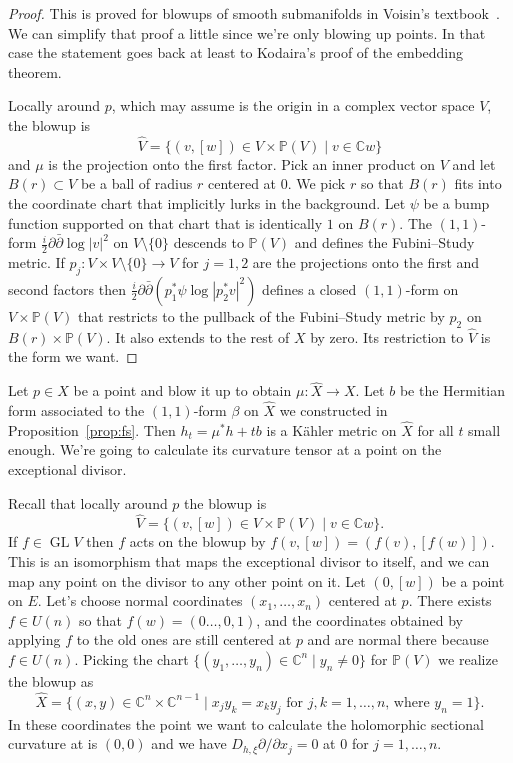 \documentclass[10pt,a4paper]{amsart}
\newcommand{\kk}[1]{\mathbb{#1}}
\DeclareMathOperator{\GL}{GL}
\def\hsc{holomorphic sectional curvature}
\def\bl#1{\widehat{#1}}
\begin{document}
\begin{proof}
This is proved for blowups of smooth submanifolds in
Voisin's textbook~\cite{voisin2002theorie}.
We can simplify that proof a little since we're only blowing up points.
In that case the statement goes back at least to Kodaira's proof of the
embedding theorem.


Locally around $p$, which may assume is the origin in a complex vector space
$V$, the blowup is
$$
\bl V
= \{ (v,[w]) \in V \times \kk P(V) \mid v \in \kk C w \}
$$
and $\mu$ is the projection onto the first factor.
Pick an inner product on $V$ and let $B(r) \subset V$ be a ball of radius $r$
centered at $0$.
We pick $r$ so that $B(r)$ fits into the coordinate chart that implicitly lurks
in the background.
Let $\psi$ be a bump function supported on that chart that is identically $1$
on $B(r)$.
The $(1,1)$-form $\frac i2 \partial\bar\partial \log |v|^2$ on $V \setminus
\{0\}$ descends to $\kk P(V)$ and defines the Fubini--Study metric.
If $p_j : V \times V \setminus \{0\} \to V$ for $j = 1,2$ are the projections
onto the first and second factors then
$\frac i2 \partial \bar\partial (p_1^*\psi \log |p_2^*v|^2)$
defines a closed $(1,1)$-form on $V \times \kk P(V)$ that restricts to the
pullback of the Fubini--Study metric by $p_2$ on $B(r) \times \kk P(V)$.
It also extends to the rest of $X$ by zero.
Its restriction to $\bl V$ is the form we want.
\end{proof}




Let $p \in X$ be a point and blow it up to obtain $\mu : \bl X \to X$.
Let $b$ be the Hermitian form associated to the $(1,1)$-form $\beta$ on $\bl X$
we constructed in Proposition~\ref{prop:fs}.
Then $h_t = \mu^*h + t b$ is a K\"ahler metric on $\bl X$ for all $t$ small
enough.
We're going to calculate its curvature tensor at a point on the exceptional
divisor.

Recall that locally around $p$ the blowup is
$$
\bl V
= \{ (v,[w]) \in V \times \kk P(V) \mid v \in \kk C w \}.
$$
If $f \in \GL V$ then $f$ acts on the blowup by $f(v, [w]) = (f(v), [f(w)])$.
This is an isomorphism that maps the exceptional divisor to itself, and we can
map any point on the divisor to any other point on it.
Let $(0, [w])$ be a point on $E$.
Let's choose normal coordinates $(x_1,\ldots,x_n)$ centered at $p$.
There exists $f \in U(n)$ so that $f(w) = (0 \ldots, 0, 1)$, and the
coordinates obtained by applying $f$ to the old ones are still centered at $p$
and are normal there because $f \in U(n)$.
Picking the chart $\{(y_1, \ldots, y_n) \in \kk C^n \mid y_n \not= 0 \}$ for
$\kk P(V)$
we realize the blowup as
$$
\bl X
= \{ (x,y) \in \kk C^n \times \kk C^{n-1}
\mid x_j y_k = x_k y_j \text{ for $j,k = 1,\ldots,n$, where $y_n = 1$}  \}.
$$
In these coordinates the point we want to calculate the \hsc{} at is $(0,0)$
and we have $D_{h,\xi} \partial / \partial x_j = 0$ at $0$ for $j = 1, \ldots, n$.
\end{document}
